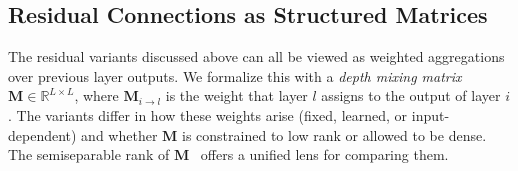 

\subsection{Residual Connections as Structured Matrices}
\label{sec:structured-depth}

The residual variants discussed above can all be viewed as weighted aggregations over previous layer outputs.
We formalize this with a \emph{depth mixing matrix} $\mathbf{M} \in \mathbb{R}^{L \times L}$, where $\mathbf{M}_{i \to l}$ is the weight that layer $l$ assigns to the output of layer $i$.
The variants differ in how these weights arise (fixed, learned, or input-dependent) and whether $\mathbf{M}$ is constrained to low rank or allowed to be dense.
The semiseparable rank of $\mathbf{M}$~\cite{mamba2} offers a unified lens for comparing them.

